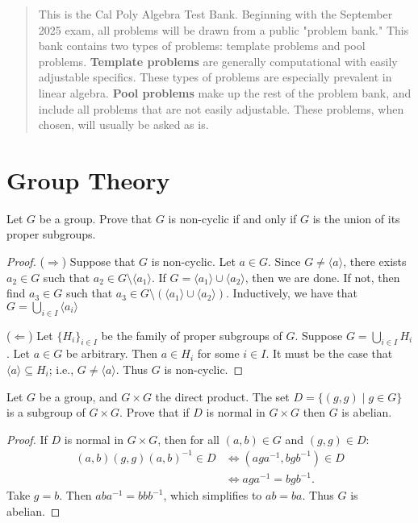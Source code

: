 \documentclass[11pt,twoside,openany]{memoir}
\begin{document}
\begin{abstract}
    This is the Cal Poly Algebra Test Bank. Beginning with the September 2025 exam, all problems will be drawn from a public "problem bank." This bank contains two types of problems: template problems and pool problems. \textbf{Template problems} are generally computational with easily adjustable specifics. These types of problems are especially prevalent in linear algebra. \textbf{Pool problems} make up the rest of the problem bank, and include all problems that are not easily adjustable. These problems, when chosen, will usually be asked as is.
\end{abstract}
\begingroup
\let\clearpage\relax
\chapter*{Group Theory}

    \iffalse
    \begin{exercise}
        Let $G$ be a group. Prove that $G$ is non-cyclic if and only if $G$ is the union of its proper subgroups.
    \end{exercise} 
        {\color{blue} \begin{proof}
            ($\Rightarrow$) Suppose that $G$ is non-cyclic. Let $a \in G$. Since $G \neq \langle a \rangle$, there exists $a_2 \in G$ such that $a_2 \in G \setminus \langle a_1 \rangle$. If $G = \langle a_1 \rangle \cup \langle a_2 \rangle$, then we are done. If not, then find $a_3 \in G$ such that $a_3 \in G \setminus \left(\langle a_1 \rangle \cup \langle a_2 \rangle\right)$. Inductively, we have that $G = \bigcup_{i \in I}\langle a_i \rangle$

            ($\Leftarrow$) Let $\{H_i\}_{i \in I}$ be the family of proper subgroups of $G$. Suppose $G = \bigcup_{i \in I}H_i$. Let $a \in G$ be arbitrary. Then $a \in H_i$ for some $i \in I$. It must be the case that $\langle a \rangle \subseteq H_i$; i.e., $G \neq \langle a \rangle$. Thus $G$ is non-cyclic.
        \end{proof}}

    \begin{exercise}
        Let $G$ be a group, and $G\times G$ the direct product. The set $D=\{(g,g)\mid g\in G\}$ is a subgroup of $G\times G$. Prove that if $D$ is normal in $G\times G$ then $G$ is abelian.
    \end{exercise}
        {\color{blue} \begin{proof}
            If $D$ is normal in $G \times G$, then for all $(a,b) \in G$ and $(g,g) \in D$:
                \begin{equation*}
                \begin{split}
                    (a,b)(g,g)(a,b)^{-1} \in D
                    & \iff (aga^{-1},bgb^{-1}) \in D \\
                    & \iff aga^{-1} = bgb^{-1}.
                \end{split}
                \end{equation*}
            Take $g = b$. Then $aba^{-1} = bbb^{-1}$, which simplifies to $ab = ba$. Thus $G$ is abelian.
        \end{proof}}
\end{document}
